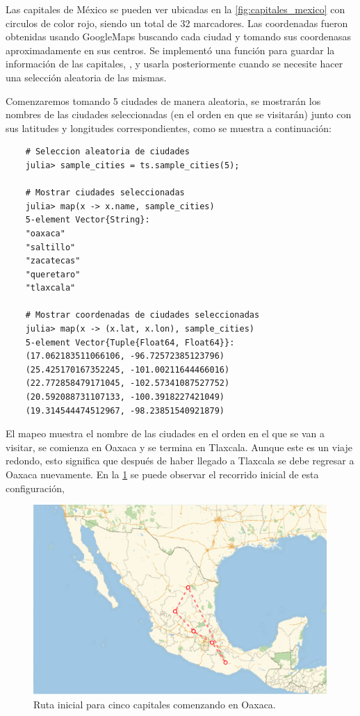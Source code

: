 Las capitales de México se pueden ver ubicadas en la \cref{fig:capitales_mexico} con circulos de color rojo, siendo un total de 32 marcadores. Las coordenadas fueron obtenidas usando GoogleMaps buscando cada ciudad y tomando sus coordenasas aproximadamente en sus centros. Se implementó una función para guardar la información de las capitales, , y usarla posteriormente cuando se necesite hacer una selección aleatoria de las mismas.

Comenzaremos tomando 5 ciudades de manera aleatoria, se mostrarán los nombres de las ciudades seleccionadas (en el orden en que se visitarán) junto con sus latitudes y longitudes correspondientes, como se muestra a continuación:
\begin{verbatim}
    # Seleccion aleatoria de ciudades
    julia> sample_cities = ts.sample_cities(5);

    # Mostrar ciudades seleccionadas
    julia> map(x -> x.name, sample_cities)
    5-element Vector{String}:
    "oaxaca"
    "saltillo"
    "zacatecas"
    "queretaro"
    "tlaxcala"

    # Mostrar coordenadas de ciudades seleccionadas
    julia> map(x -> (x.lat, x.lon), sample_cities)
    5-element Vector{Tuple{Float64, Float64}}:
    (17.062183511066106, -96.72572385123796)
    (25.425170167352245, -101.00211644466016)
    (22.772858479171045, -102.57341087527752)
    (20.592088731107133, -100.3918227421049)
    (19.314544474512967, -98.23851540921879)
\end{verbatim}

El mapeo muestra el nombre de las ciudades en el orden en el que se van a visitar, se comienza en Oaxaca y se termina en Tlaxcala. Aunque este es un viaje redondo, esto significa que después de haber llegado a Tlaxcala se debe regresar a Oaxaca nuevamente. En la \cref{fig:trip_cities_05_init} se puede observar el recorrido inicial de esta configuración, 
\begin{figure}[ht!]
    \centering
    \includegraphics[scale=0.8]{../figures/trip_cities_05_init.pdf}
    \caption{Ruta inicial para cinco capitales comenzando en Oaxaca.}
    \label{fig:trip_cities_05_init}
\end{figure}

